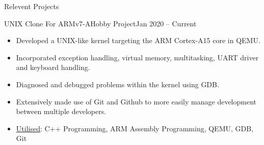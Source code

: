 \documentclass[]{mcdowellcv}
\begin{document}
	\begin{cvsection}{Relevent Projects}
		\begin{cvsubsection}{UNIX Clone For ARMv7-A}{Hobby Project}{Jan 2020 -- Current}
			\begin{itemize}
				\item Developed a UNIX-like kernel targeting the ARM Cortex-A15 core in QEMU.
				\item Incorporated exception handling, virtual memory, multitasking, UART driver and keyboard handling.
				\item Diagnosed and debugged problems within the kernel using GDB.
				\item Extensively made use of Git and Github to more easily manage development between multiple developers.
				\item \underline{Utilised}: C++ Programming, ARM Assembly Programming, QEMU, GDB, Git
			\end{itemize}
		\end{cvsubsection}


\end{cvsection}
\end{document}
